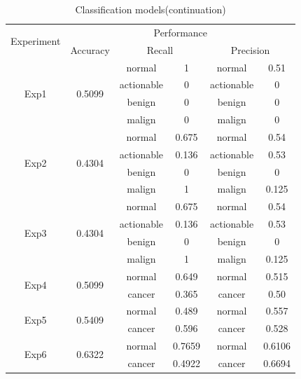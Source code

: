 \begin{table}[H]
    \centering
    \begin{tabular}{|c|c|c|c|c|c|}
     \hline
     \multirow{2}{5em}{Experiment}  & \multicolumn{5}{c|}{Performance}
     \\ \cline{2-6}
     & Accuracy & \multicolumn{2}{c|}{Recall} & \multicolumn{2}{c|}{Precision} 
     \\ \cline{3-6}
     \hline \hline
     \multirow{4}{5em}{Exp1} & \multirow{4}{5em}{0.5099} & normal & 1 & normal & 0.51 \\ \cline{3-6}
     & & actionable & 0 & actionable & 0 \\ \cline{3-6}
     & & benign & 0 & benign & 0 \\ \cline{3-6}
     & & malign & 0 & malign & 0 \\ \cline{3-6}
     \hline
     \multirow{4}{5em}{Exp2} & \multirow{4}{5em}{0.4304} & normal & 0.675 & normal & 0.54 \\ \cline{3-6}
     & & actionable & 0.136 & actionable & 0.53 \\ \cline{3-6}
     & & benign & 0 & benign & 0 \\ \cline{3-6}
     & & malign & 1 & malign & 0.125 \\ \cline{3-6}
     \hline
     \multirow{4}{5em}{Exp3} & \multirow{4}{5em}{0.4304} & normal & 0.675 & normal & 0.54 \\ \cline{3-6}
     & & actionable & 0.136 & actionable & 0.53 \\ \cline{3-6}
     & & benign & 0 & benign & 0 \\ \cline{3-6}
     & & malign & 1 & malign & 0.125 \\ \cline{3-6}
     \hline
     \multirow{2}{5em}{Exp4} & \multirow{2}{5em}{0.5099} & normal & 0.649 & normal & 0.515 \\ \cline{3-6}
     & & cancer & 0.365 & cancer & 0.50 \\ \cline{3-6}
     \hline
     \multirow{2}{5em}{Exp5} & \multirow{2}{5em}{0.5409} & normal & 0.489 & normal & 0.557 \\ \cline{3-6}
     & & cancer & 0.596 & cancer & 0.528 \\ \cline{3-6}
     \hline
     \multirow{2}{5em}{Exp6} & \multirow{2}{5em}{0.6322} & normal & 0.7659 & normal & 0.6106 \\ \cline{3-6}
     & & cancer & 0.4922 & cancer & 0.6694 \\ \cline{3-6}
     \hline
    \end{tabular}
    \caption{Classification models(continuation)}
    \label{tab:tab6}
\end{table}

